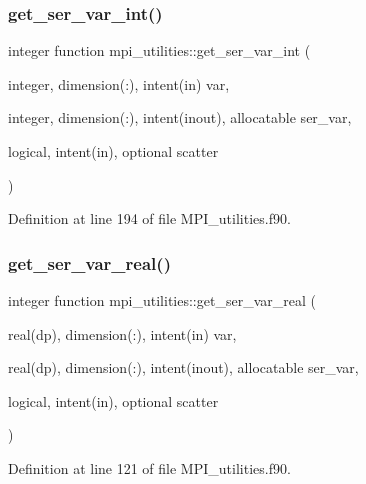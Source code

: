 \mbox{\label{namespacempi__utilities_ac8eaaa2c9c0901f0e4ea4679986e8c7d}} 
\subsubsection{\texorpdfstring{get\+\_\+ser\+\_\+var\+\_\+int()}{get\_ser\_var\_int()}}
{\footnotesize\ttfamily integer function mpi\+\_\+utilities\+::get\+\_\+ser\+\_\+var\+\_\+int (\begin{DoxyParamCaption}\item[{integer, dimension(\+:), intent(in)}]{var,  }\item[{integer, dimension(\+:), intent(inout), allocatable}]{ser\+\_\+var,  }\item[{logical, intent(in), optional}]{scatter }\end{DoxyParamCaption})}



Definition at line 194 of file M\+P\+I\+\_\+utilities.\+f90.

\mbox{\label{namespacempi__utilities_a4ecf85687516f8d8d942afe05652d963}} 
\subsubsection{\texorpdfstring{get\+\_\+ser\+\_\+var\+\_\+real()}{get\_ser\_var\_real()}}
{\footnotesize\ttfamily integer function mpi\+\_\+utilities\+::get\+\_\+ser\+\_\+var\+\_\+real (\begin{DoxyParamCaption}\item[{real(dp), dimension(\+:), intent(in)}]{var,  }\item[{real(dp), dimension(\+:), intent(inout), allocatable}]{ser\+\_\+var,  }\item[{logical, intent(in), optional}]{scatter }\end{DoxyParamCaption})}



Definition at line 121 of file M\+P\+I\+\_\+utilities.\+f90.

